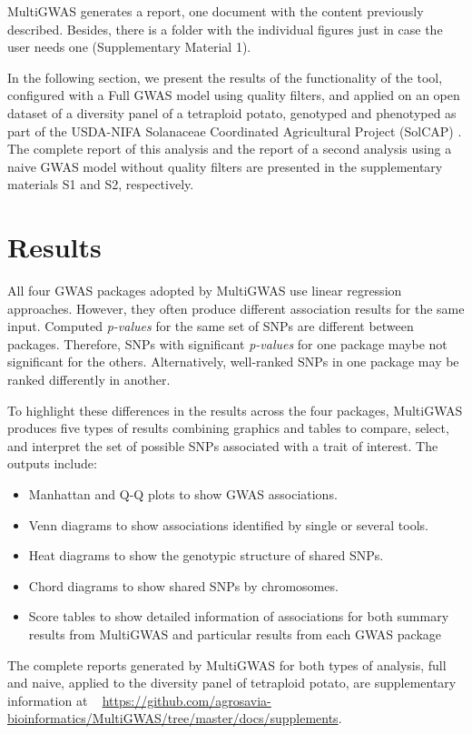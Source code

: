 \documentclass{article}
\begin{document}
MultiGWAS generates a report, one document with the content previously described. Besides, there is a folder with the individual figures just in case the user needs one (Supplementary Material 1). 


In the following section, we present the results of the functionality of the tool, configured with a Full GWAS model using quality filters, and applied on an open dataset of a diversity panel of a tetraploid potato, genotyped and phenotyped as part of the USDA-NIFA Solanaceae Coordinated Agricultural Project (SolCAP) \cite{Hirsch2013}. The complete report of this analysis and the report of a second analysis using a naive GWAS model without quality filters are presented in the supplementary materials S1 and S2, respectively.


\section{Results}

All four GWAS packages adopted by MultiGWAS use linear regression approaches. However, they often produce different association results for the same input. Computed \emph{p-values }for the same set of SNPs are different between packages. Therefore, SNPs with significant \emph{p-values} for one package maybe not significant for the others. Alternatively, well-ranked SNPs in one package may be ranked differently in another. 

To highlight these differences in the results across the four packages, MultiGWAS produces five types of results combining graphics and tables to compare, select, and interpret the set of possible SNPs associated with a trait of interest. The outputs include: 
\begin{itemize}
\item Manhattan and Q-Q plots to show GWAS associations. 
\item Venn diagrams to show associations identified by single or several tools.
\item Heat diagrams to show the genotypic structure of shared SNPs.
\item Chord diagrams to show shared SNPs by chromosomes.
\item Score tables to show detailed information of associations for both summary results from MultiGWAS and particular results from each GWAS
package
\end{itemize}

The complete reports generated by MultiGWAS for both types of analysis, full and naive, applied to the diversity panel of tetraploid potato, are supplementary information at ~ \url{https://github.com/agrosavia-bioinformatics/MultiGWAS/tree/master/docs/supplements}.
\end{document}
